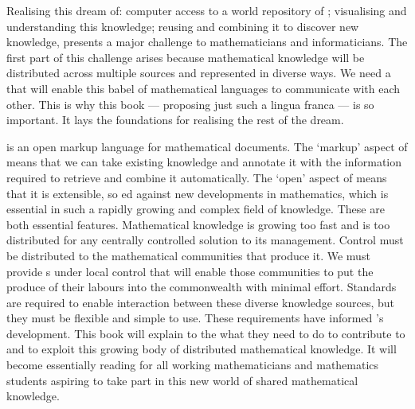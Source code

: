 Realising this dream of: computer access to a world repository of
{}; visualising and understanding this knowledge; reusing
and combining it to discover new knowledge, presents a major challenge to mathematicians
and informaticians.  The first part of this challenge arises because mathematical
knowledge will be distributed across multiple sources and represented in diverse ways. We
need a {} that will enable this babel of mathematical languages to
communicate with each other. This is why this book --- proposing just such a lingua franca
--- is so important. It lays the foundations for realising the rest of the dream.

{\omdoc} is an open markup language for mathematical documents. The `markup' aspect of
{\omdoc} means that we can take existing knowledge and annotate it with the information
required to retrieve and combine it automatically. The `open' aspect of {\omdoc} means
that it is extensible, so {ed} against new developments in
mathematics, which is essential in such a rapidly growing and complex field of
knowledge. These are both essential features. Mathematical knowledge is growing too fast
and is too distributed for any centrally controlled solution to its management. Control
must be distributed to the mathematical communities that produce it. We must provide
{s} under local control that will enable those communities
to put the produce of their labours into the commonwealth with minimal effort. Standards
are required to enable interaction between these diverse knowledge sources, but they must
be flexible and simple to use. These requirements have informed {\omdoc}'s
development. This book will explain to the
{} what they need to do to contribute to
and to exploit this growing body of distributed mathematical knowledge. It will become
essentially reading for all working mathematicians and mathematics students aspiring to
take part in this new world of shared mathematical knowledge.


